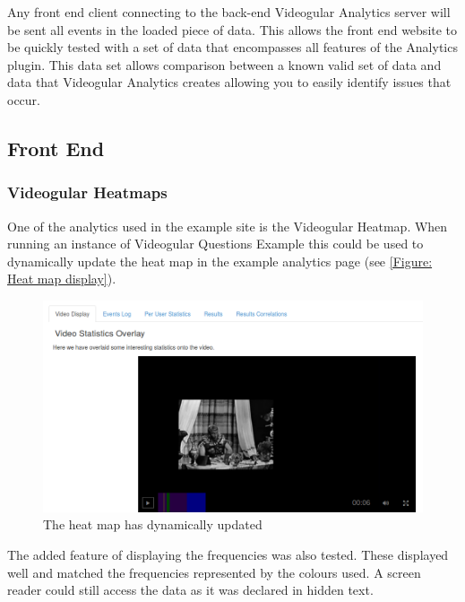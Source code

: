 Any front end client connecting to the back-end Videogular Analytics server will be sent all events in the loaded piece of data. This allows the front end website to be quickly tested with a set of data that encompasses all features of the Analytics plugin. This data set allows comparison between a known valid set of data and data that Videogular Analytics creates allowing you to easily identify issues that occur.


\subsection{Front End}




\subsubsection{Videogular Heatmaps}
\label{Subsubsection:Videogular Heatmaps in example}

One of the analytics used in the example site is the \gls{Videogular} Heatmap. When running an instance of \gls{Videogular} Questions Example this could be used to dynamically update the heat map in the example analytics page (see \autoref{Figure: Heat map display}).

\begin{figure}[h]
	\centering
		\includegraphics[scale=0.4]{../figures/heatmapDisplay.png}
	\caption{\label{Figure: Heat map display} The heat map has dynamically updated}
\end{figure}

The added feature of displaying the frequencies was also tested. These displayed well and matched the frequencies represented by the colours used. A screen reader could still access the data as it was declared in hidden text.

